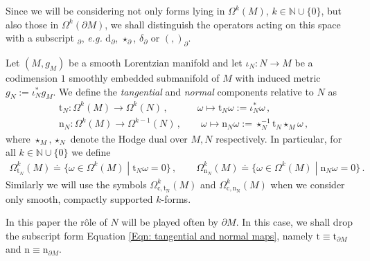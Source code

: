 \begin{remark}
	Since we will be considering not only forms lying in $\Omega^k(M)$, $k\in\mathbb{N}\cup\{0\}$, but also those in $\Omega^k(\partial M)$, we shall distinguish the operators acting on this space with a subscript $_\partial$, {\it e.g.} $\mathrm{d}_\partial$, $\star_\partial$, $\delta_\partial$ or $(,)_\partial$.
\end{remark}



\begin{Definition}\label{Def: tangential and normal component}
	Let $(M,g_M)$ be a smooth Lorentzian manifold and let $\iota_N\colon N\to M$ be a codimension $1$ smoothly embedded submanifold of $M$ with induced metric $g_N:=\iota_N^*g_M$.
	We define the \textit{tangential} and \textit{normal} components relative to $N$ as 
	\begin{subequations}\label{Eqn: tangential and normal maps}
		\begin{align}
		&\mathrm{t}_N\colon\Omega^k(M)\to\Omega^k(N)\,,\qquad\quad\omega\mapsto
		\mathrm{t}_N\omega:=\iota_N^*\omega\,,\\
		&\mathrm{n}_N\colon\Omega^k(M)\to\Omega^{k-1}(N)\,,\qquad\omega\mapsto
		\mathrm{n}_N\omega:=\star_N^{-1}\mathrm{t}_N\star_M\omega\,,
		\end{align}
	\end{subequations}
	where $\star_M,\star_N$ denote the Hodge dual over $M,N$ respectively.
	In particular, for all $k\in\mathbb{N}\cup\{0\}$ we define
	\begin{align}\label{Eqn: k-forms with vanishing tangential or normal component}
	\Omega_{\mathrm{t}_N}^k(M)\doteq\lbrace\omega\in\Omega^k(M)\;|\;\mathrm{t}_N\omega=0\rbrace\,,\qquad
	\Omega_{\mathrm{n}_N}^k(M)\doteq\lbrace\omega\in\Omega^k(M)\;|\;\mathrm{n}_N\omega=0\rbrace\,.
	\end{align}
	Similarly we will use the symbols $\Omega_{\mathrm{c,t_N}}^k(M)$ and $\Omega_{\mathrm{c,n_N}}^k(M)$ when we consider only smooth, compactly supported $k$-forms.
\end{Definition}

\begin{remark}
	In this paper the r\^ole of $N$ will be played often by $\partial M$. In this case, we shall drop the subscript form Equation \eqref{Eqn: tangential and normal maps}, namely $\mathrm{t}\equiv\mathrm{t}_{\partial M}$ and $\mathrm{n}\equiv\mathrm{n}_{\partial M}$.
\end{remark}

